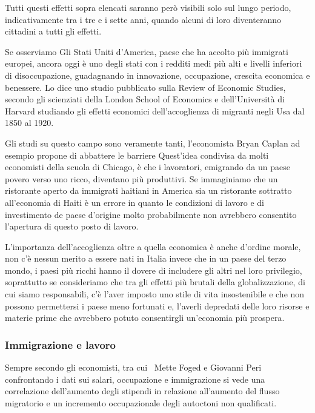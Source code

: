 \documentclass[12pt]{book} %
\begin{document}
Tutti questi effetti sopra elencati saranno però visibili solo sul lungo periodo, indicativamente tra i tre e i sette
anni, quando alcuni di loro diventeranno cittadini a tutti gli effetti.


\bigskip

Se osserviamo Gli Stati Uniti d'America, paese che ha accolto più immigrati europei, ancora oggi è uno degli stati con i
redditi medi più alti e livelli inferiori di disoccupazione, guadagnando in innovazione, occupazione, crescita
economica e benessere. Lo dice uno studio pubblicato sulla Review of Economic Studies, secondo gli scienziati della
London School of Economics e dell'Università di Harvard studiando gli effetti economici dell'accoglienza di migranti
negli Usa dal 1850 al 1920. 


\bigskip

Gli studi su questo campo sono veramente tanti, l'economista Bryan Caplan ad esempio propone di
abbattere le
barriere Quest'idea condivisa da molti economisti della scuola di Chicago, è che i lavoratori, emigrando
da un paese povero verso uno ricco, diventano più produttivi. Se immaginiamo che un ristorante aperto da immigrati
haitiani in America sia un ristorante sottratto all'economia di Haiti è un errore in quanto le
condizioni di lavoro e di investimento de paese d'origine molto probabilmente non avrebbero
consentito l'apertura di questo posto di lavoro.

L'importanza dell'accoglienza oltre a quella economica è anche
d'ordine morale, non c'è nessun merito a essere nati in Italia invece che in
un paese del terzo mondo, i paesi più ricchi hanno il dovere di includere gli altri nel loro privilegio, soprattutto se
consideriamo che tra gli effetti più brutali della globalizzazione, di cui siamo responsabili, c'è
l'aver imposto uno stile di vita insostenibile e che non possono permettersi i paese meno
fortunati e, l'averli depredati delle loro risorse e materie prime che avrebbero potuto
consentirgli un'economia più prospera.


\bigskip

\subsubsection{Immigrazione e lavoro}
Sempre secondo gli economisti, tra cui \ Mette Foged e Giovanni
Peri confrontando i
dati sui salari, occupazione e immigrazione si vede una correlazione dell'aumento degli stipendi
in relazione all'aumento del flusso migratorio e un incremento occupazionale degli autoctoni non
qualificati.
\end{document}

